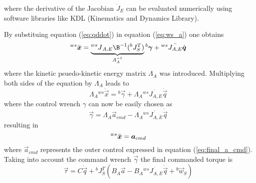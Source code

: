 where the derivative of the Jacobian $\dot{J}_{E}$ can be evaluated numerically
using software libraries like KDL (Kinematics and Dynamics Library).
\par
By substituing equation (\ref{eq:qddot}) in equation (\ref{eq:ws_a}) one obtains
\[
\prescript{ws}{}{\ddot{\vec{x}}} = \underbrace{\prescript{ws}{}{J}_{A,E} \B^{-1} ({}^b J_{S}^T)}_{\Lambda_A^{-1}} {}^b \vec{\gamma} + {}^{ws} \ddot{J_{A,E}} \dot{\vec{q}}
\]
where the kinetic psuedo-kinetic energy matrix $\Lambda_{A}$ was introduced. Multiplying both sides of the equation
by $\Lambda_{A}$ leads to
\[
\Lambda_A {}^{ws} \ddot{\vec{x}} =  {}^b \vec{\gamma} +  \Lambda_A  {}^{ws} \dot{J_{A,E}} \dot{\vec{q}}
\]
where the control wrench $\gamma$ can now be easily chosen as
\[\label{eq:gamma}
\vec{\gamma} = \Lambda_A \vec{a}_{cmd} - \Lambda_A {}^{ws} \dot{J_{A,E}} \dot{\vec{q}}
\]
resulting in
\[
\prescript{ws}{}{\ddot{\vec{x}}} = \vec{a}_{cmd}
\]
where $\vec{a}_{cmd}$ represents the outer control expressed in equation (\ref{eq:final_a_cmd}).
Taking into account the command wrench $\vec{\gamma}$ the final commanded torque is
\begin{equation}\label{eq:torque_wo_null}
  \vec{\tau} = C \dot{\vec{q}} + {}^{b}J^{T}_{S} ( B_A \vec{a} - B_A {}^{ws} \dot{J_{A,E}} \dot{\vec{q}} + {}^b\vec{w}_{S})
\end{equation}

